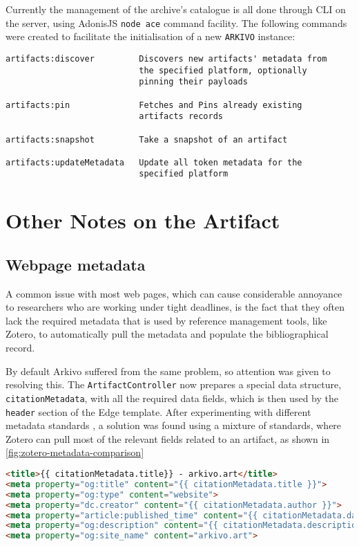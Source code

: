 Currently the management of the archive's catalogue is all done through CLI on the server, using AdonisJS \texttt{node ace} command facility.
The following commands were created to facilitate the initialisation of a new \texttt{ARKIVO} instance:

{\footnotesize
\begin{verbatim}
artifacts:discover         Discovers new artifacts' metadata from
                           the specified platform, optionally
                           pinning their payloads

artifacts:pin              Fetches and Pins already existing
                           artifacts records

artifacts:snapshot         Take a snapshot of an artifact

artifacts:updateMetadata   Update all token metadata for the
                           specified platform
\end{verbatim}
}



\section{Other Notes on the Artifact}

\subsection{Webpage metadata}

A common issue with most web pages, which can cause considerable annoyance to researchers who are working under tight deadlines, is the fact that they often lack the required metadata that is used by reference management tools, like Zotero, to automatically pull the metadata and populate the bibliographical record.

By default Arkivo suffered from the same problem, so attention was given to resolving this.
The \texttt{ArtifactController} now prepares a special data structure, \texttt{citationMetadata}, with all the required data fields, which is then used by the \texttt{header} section of the Edge template.
After experimenting with different metadata standards \cite{DevExposing_metadataZotero}\cite{zahidOpenGraphMeta2023} , a solution was found using a mixture of standards, where Zotero can pull most of the relevant fields related to an artifact, as shown in \autoref{fig:zotero-metadata-comparison}


\begin{lstlisting}[language=HTML, caption={Artifact page metadata}] 
<title>{{ citationMetadata.title}} - arkivo.art</title>
<meta property="og:title" content="{{ citationMetadata.title }}">
<meta property="og:type" content="website">
<meta property="dc.creator" content="{{ citationMetadata.author }}">
<meta property="article:published_time" content="{{ citationMetadata.date }}">
<meta property="og:description" content="{{ citationMetadata.description }}">
<meta property="og:site_name" content="arkivo.art">
\end{lstlisting}


